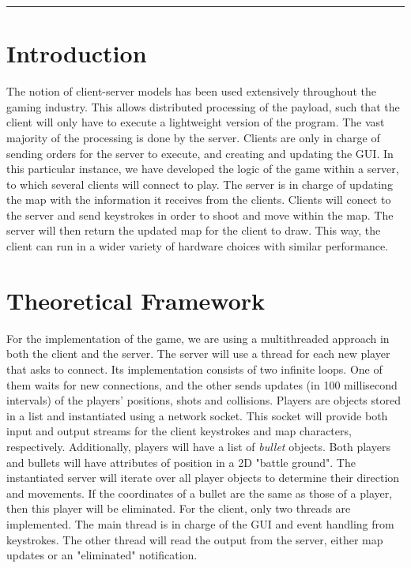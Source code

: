 \documentclass[10pt,a4paper]{article}
\theoremstyle{definition}
\begin{document}
\vspace{20pt}
\hrule
\vspace{10pt}

\section{Introduction}
The notion of client-server models has been used extensively throughout the gaming industry. 
This allows distributed processing of the payload, such that the client will only have to execute a lightweight version of the program. 
The vast majority of the processing is done by the server. 
Clients are only in charge of sending orders for the server to execute, and creating and updating the GUI. 
In this particular instance, we have developed the logic of the game within a server, to which several clients will connect to play. 
The server is in charge of updating the map with the information it receives from the clients. 
Clients will conect to the server and send keystrokes in order to shoot and move within the map. 
The server will then return the updated map for the client to draw.
This way, the client can run in a wider variety of hardware choices with similar performance.


\section{Theoretical Framework}
For the implementation of the game, we are using a multithreaded approach in both the client and the server. 
The server will use a thread for each new player that asks to connect. 
Its implementation consists of two infinite loops. 
One of them waits for new connections, and the other sends updates (in 100 millisecond intervals) of the players' positions, shots and collisions. 
Players are objects stored in a list and instantiated using a network socket. 
This socket will provide both input and output streams for the client keystrokes and map characters, respectively. 
Additionally, players will have a list of \textit{bullet} objects. 
Both players and bullets will have attributes of position in a 2D "battle ground". 
The instantiated server will iterate over all player objects to determine their direction and movements. 
If the coordinates of a bullet are the same as those of a player, then this player will be eliminated. 
For the client, only two threads are implemented. 
The main thread is in charge of the GUI and event handling from keystrokes. 
The other thread will read the output from the server, either map updates or an "eliminated" notification.
\end{document}
